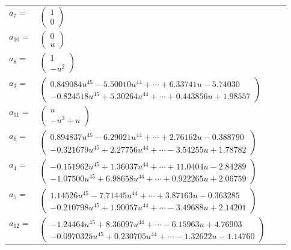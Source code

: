 \documentclass[1p]{elsarticle_modified}
\theoremstyle{definition}
\begin{document}
\begin{tabular}{m{7pt} m{180pt} m{7pt} m{180pt} }
\flushright $a_{7}=$&$\begin{pmatrix}1\\0\end{pmatrix}$ \\
\flushright $a_{10}=$&$\begin{pmatrix}0\\u\end{pmatrix}$ \\
\flushright $a_{8}=$&$\begin{pmatrix}1\\- u^2\end{pmatrix}$ \\
\flushright $a_{3}=$&$\begin{pmatrix}0.849084 u^{45}-5.50010 u^{44}+\cdots+6.33741 u-5.74030\\-0.824518 u^{45}+5.30264 u^{44}+\cdots+0.443856 u+1.98557\end{pmatrix}$ \\
\flushright $a_{11}=$&$\begin{pmatrix}u\\- u^3+u\end{pmatrix}$ \\
\flushright $a_{6}=$&$\begin{pmatrix}0.894837 u^{45}-6.29021 u^{44}+\cdots+2.76162 u-0.388790\\-0.321679 u^{45}+2.27756 u^{44}+\cdots-3.54255 u+1.78782\end{pmatrix}$ \\
\flushright $a_{4}=$&$\begin{pmatrix}-0.151962 u^{45}+1.36037 u^{44}+\cdots+11.0404 u-2.84289\\-1.07500 u^{45}+6.98658 u^{44}+\cdots+0.922265 u+2.06759\end{pmatrix}$ \\
\flushright $a_{5}=$&$\begin{pmatrix}1.14526 u^{45}-7.71445 u^{44}+\cdots+3.87163 u-0.363285\\-0.210798 u^{45}+1.90057 u^{44}+\cdots-3.49688 u+2.14201\end{pmatrix}$ \\
\flushright $a_{12}=$&$\begin{pmatrix}-1.24464 u^{45}+8.36097 u^{44}+\cdots-6.15963 u+4.76903\\-0.0970325 u^{45}+0.230705 u^{44}+\cdots-1.32622 u-1.14760\end{pmatrix}$ \\

\end{tabular}
\end{document}
